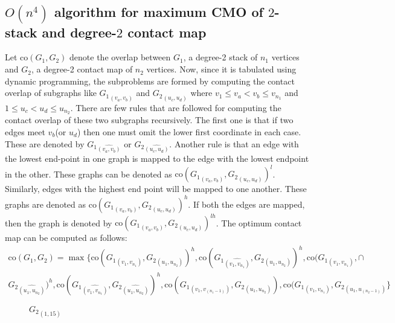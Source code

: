 \subsection{$O(n^4)$ algorithm for maximum CMO of $2$-stack and degree-$2$ contact map}

Let $\text{co}(G_1,G_2)$ denote the overlap between $G_1$, a degree-2 stack of $n_1$ vertices and $G_2$, a degree-2 contact map of $n_2$ vertices. Now, since it is tabulated using dynamic programming, the subproblems are formed by computing the contact overlap of subgraphs like ${G_1}_{(v_a,v_b)}$ and ${G_2}_{(u_c,u_d)}$ where $v_1 \leq v_a < v_b \leq v_{n_1}$ and $1 \leq u_c < u_d \leq u_{n_2}$. There are few rules that are followed for computing the contact overlap of these two subgraphs recursively. The first one is that if two edges meet $v_b$(or $u_d$) then one must omit the lower first coordinate in each case. These are denoted by ${G_1}_{\hat{(v_a,v_b)}}$ or ${G_2}_{\hat{(u_c,u_d)}}$. Another rule is that an edge with the lowest end-point in one graph is mapped to the edge with the lowest endpoint in the other. These graphs can be denoted as $\text{co}({G_1}_{(v_a,v_b)}, {G_2}_{(u_c,u_d)})^l$. Similarly, edges with the highest end point will be mapped to one another. These graphs are denoted as $\text{co}({G_1}_{(v_a,v_b)}, {G_2}_{(u_c,u_d)})^h$. If both the edges are mapped, then the graph is denoted by $\text{co}({G_1}_{(v_a,v_b)}, {G_2}_{(u_c,u_d)})^{lh}$. The optimum contact map can be computed as follows:
\begin{eqnarray}
\label{sqs1}
\text{co}(G_1,G_2) = \max\{\text{co}({G_1}_{(v_1,v_{n_1})}, {G_2}_{(u_1,u_{n_2})})^h,\text{co}({G_1}_{\hat{(v_1,v_{n_1})}}, {G_2}_{(u_1,u_{n_2})})^h,\text{co}({G_1}_{(v_1,v_{n_1})}, \cap \nonumber \\ {G_2}_{\hat{(u_1,u_{n_2})}})^h,\text{co}({G_1}_{\hat{(v_1,v_{n_1})}}, {G_2}_{\hat{(u_1,u_{n_2})}})^h,\text{co}({G_1}_{(v_1,v_{(n_1-1)})}, {G_2}_{(u_1,u_{n_2})}),\text{co}({G_1}_{(v_1,v_{n_1})}, {G_2}_{(u_1,u_{(n_2-1)})}\}
\end{eqnarray}

\begin{figure}[htbp]
\begin{minipage}[b]{0.50\linewidth}
\centering
 
 \vspace{0.65cm}
 \caption{${G_1}_{(1,15)}$}
 \label{fig:$S_{(1,15)}$}
\end{minipage}
\begin{minipage}[b]{0.50\linewidth}
\centering
 
 \vspace{0.65cm}
 \caption{${G_2}_{(1,15)}$}
 \label{fig:$G_{(1,15)}$}
\end{minipage}
\end{figure}

